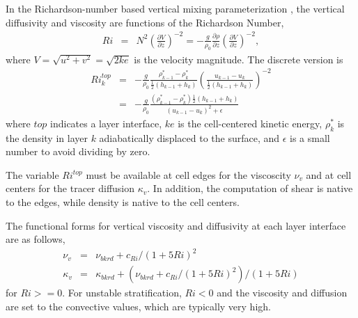 In the Richardson-number based vertical mixing parameterization \citep{Pacanowski_Philander81jpo}, the vertical diffusivity and viscosity are functions of the Richardson Number,
\begin{eqnarray}   
\label{ocean:\mode_Ri1}
Ri &=& N^2
\left(\frac{\partial V}{\partial z} \right)^{-2}
 = -\frac{g}{\rho_0}\frac{\partial \rho}{\partial z}
\left(\frac{\partial V}{\partial z} \right)^{-2},
\end{eqnarray}
where $V=\sqrt{u^2+v^2}=\sqrt{2ke}$ is the velocity magnitude.  The discrete version is
\begin{eqnarray}   
Ri^{top}_k &=& -\frac{g}{\rho_0}\frac{\rho^*_{k-1}-\rho^*_k}{\frac{1}{2}(h_{k-1}+h_k)}
\left(\frac{u_{k-1}-u_k}{\frac{1}{2}(h_{k-1}+h_k)}\right)^{-2}\\
 &=& -\frac{g}{\rho_0}\frac{(\rho^*_{k-1}-\rho^*_k)\frac{1}{2}(h_{k-1}+h_k)}
{(u_{k-1}-u_k)^2+\epsilon}
\end{eqnarray}
where $top$ indicates a layer interface, $ke$ is the cell-centered kinetic energy, $\rho^*_k$ is the density in layer $k$ adiabatically displaced to the surface, and $\epsilon$ is a small number to avoid dividing by zero.  

The variable $Ri^{top}$ must be available at cell edges for the viscoscity $\nu_v$ and at cell centers for the tracer diffusion $\kappa_v$.  In addition, the computation of shear is native to the edges, while density is native to the cell centers.  

The functional forms for vertical viscosity and diffusivity at each layer interface are as follows,
\begin{eqnarray} \label{ocean:\mode_visc1}  
\nu_v &=& \nu_{bkrd} + c_{Ri}/(1+5Ri)^2\\
\kappa_v &=& \kappa_{bkrd} + (\nu_{bkrd} + c_{Ri}/(1+5Ri)^2)/(1+5Ri)
\end{eqnarray}
for $Ri>=0$.  For unstable stratification, $Ri<0$ and the viscosity and diffusion are set to the convective values, which are typically very high.
